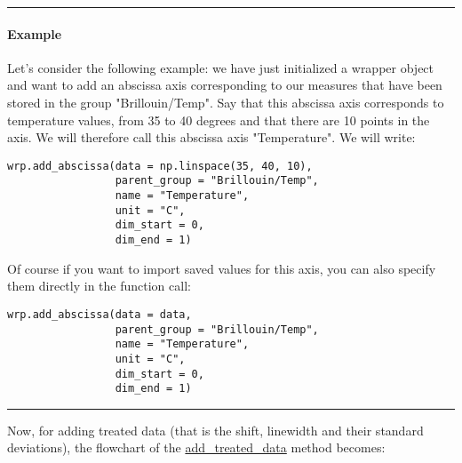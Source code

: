 \begin{center}
    \rule{15cm}{0.4pt}
\end{center}

\paragraph{Example}
Let's consider the following example: we have just initialized a wrapper object and want to add an abscissa axis corresponding to our measures that have been stored in the group "Brillouin/Temp". Say that this abscissa axis corresponds to temperature values, from 35 to 40 degrees and that there are 10 points in the axis. We will therefore call this abscissa axis "Temperature". We will write:
\begin{lstlisting}
wrp.add_abscissa(data = np.linspace(35, 40, 10),
                 parent_group = "Brillouin/Temp", 
                 name = "Temperature",
                 unit = "C",
                 dim_start = 0,
                 dim_end = 1)
\end{lstlisting}

Of course if you want to import saved values for this axis, you can also specify them directly in the function call:
\begin{lstlisting}
wrp.add_abscissa(data = data,
                 parent_group = "Brillouin/Temp", 
                 name = "Temperature",
                 unit = "C",
                 dim_start = 0,
                 dim_end = 1)
\end{lstlisting}

\begin{center}
    \rule{15cm}{0.4pt}
\end{center}

Now, for adding treated data (that is the shift, linewidth and their standard deviations), the flowchart of the \hyperref[subsec:wrapper.add_treated_data]{add\_treated\_data} method becomes:

